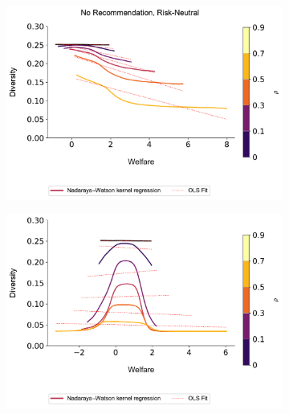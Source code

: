 \documentclass[manuscript]{acmart}
\begin{document}
\begin{figure}[t]
\caption{Diversity vs. Welfare}
\begin{minipage}{1.2\textwidth}
\hspace*{-1cm}\begin{subfigure}{.23\textwidth}
\includegraphics[width=1.0\linewidth]{figures/diversity_welfare_rn_n_200.pdf}
\end{subfigure}
\begin{subfigure}{.23\textwidth}
\includegraphics[width=1.0\linewidth]{figures/diversity_welfare_ra_n_200.pdf}
\end{subfigure}
\begin{subfigure}{.23\textwidth}

\end{subfigure}
\end{minipage}
\end{figure}
\end{document}
